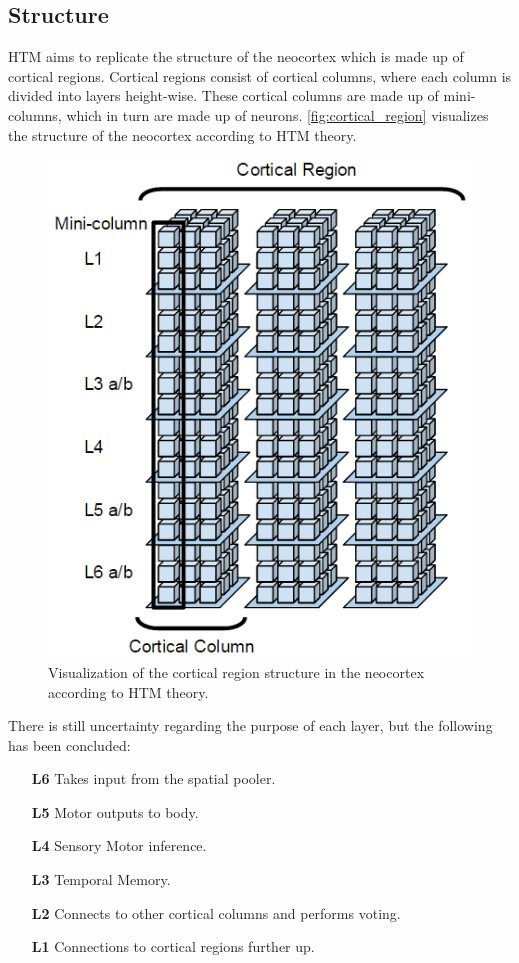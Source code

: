 \subsection{Structure}
HTM aims to replicate the structure of the neocortex which is made up of cortical regions. Cortical regions consist of cortical columns, where each column is divided into layers height-wise. These cortical columns are made up of mini-columns, which in turn are made up of neurons. \autoref{fig:cortical_region} visualizes the structure of the neocortex according to HTM theory.
\begin{figure}[H]
    \centering
    \includegraphics[width=\textwidth]{resources/related_works/cortical_region}
    \caption{Visualization of the cortical region structure in the neocortex according to HTM theory.}
    \label{fig:cortical_region}
\end{figure}
There is still uncertainty regarding the purpose of each layer, but the following has been concluded\cite{htm_l2_l3,cortical_region}:
\begin{itemize}
    \item[\textbf{L6}] Takes input from the spatial pooler.
    \item[\textbf{L5}] Motor outputs to body.
    \item[\textbf{L4}] Sensory Motor inference.
    \item[\textbf{L3}] Temporal Memory.
    \item[\textbf{L2}] Connects to other cortical columns and performs voting.
    \item[\textbf{L1}] Connections to cortical regions further up.
\end{itemize}
